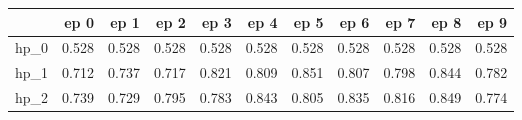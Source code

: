 \begin{tabular}{lrrrrrrrrrr}
\toprule
{} &   ep 0 &   ep 1 &   ep 2 &   ep 3 &   ep 4 &   ep 5 &   ep 6 &   ep 7 &   ep 8 &   ep 9 \\
\midrule
hp\_0 &  0.528 &  0.528 &  0.528 &  0.528 &  0.528 &  0.528 &  0.528 &  0.528 &  0.528 &  0.528 \\
hp\_1 &  0.712 &  0.737 &  0.717 &  0.821 &  0.809 &  0.851 &  0.807 &  0.798 &  0.844 &  0.782 \\
hp\_2 &  0.739 &  0.729 &  0.795 &  0.783 &  0.843 &  0.805 &  0.835 &  0.816 &  0.849 &  0.774 \\
\bottomrule
\end{tabular}
